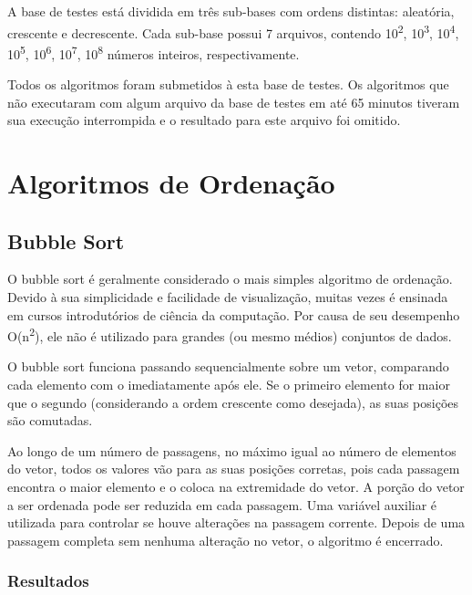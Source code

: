 \documentclass[fleqn,10pt]{SelfArx} %
\begin{document}
A base de testes está dividida em três sub-bases com ordens distintas: aleatória, crescente e decrescente. 
Cada sub-base possui 7 arquivos, contendo 10\textsuperscript{2}, 10\textsuperscript{3}, 10\textsuperscript{4}, 
10\textsuperscript{5}, 10\textsuperscript{6}, 10\textsuperscript{7}, 10\textsuperscript{8} números inteiros,
respectivamente.  

Todos os algoritmos foram submetidos à esta base de testes. Os algoritmos que não executaram com algum arquivo da base de 
testes em até 65 minutos tiveram sua execução interrompida e o resultado para este arquivo foi omitido.


\section{Algoritmos de Ordenação}

\subsection{Bubble Sort}

O bubble sort é geralmente considerado o mais simples algoritmo de ordenação. Devido à sua simplicidade e facilidade 
de visualização, muitas vezes é ensinada em cursos introdutórios de ciência da computação. Por causa de seu
desempenho O(n\textsuperscript{2}), ele não é utilizado para grandes (ou mesmo médios) conjuntos de dados.

O bubble sort funciona passando sequencialmente sobre um vetor, comparando cada elemento com o imediatamente após ele. Se 
o primeiro elemento for maior que o segundo (considerando a ordem crescente como desejada), as suas posições são comutadas. 

Ao longo de um número de passagens, no máximo igual ao número de elementos do vetor, todos os valores vão para as suas 
posições corretas, pois cada passagem encontra o maior elemento e o coloca na extremidade do vetor. A porção do vetor a ser 
ordenada pode ser reduzida em cada passagem. Uma variável auxiliar é utilizada para controlar se houve alterações 
na passagem corrente. Depois de uma passagem completa sem nenhuma alteração no vetor, o algoritmo é encerrado.

\subsubsection*{Resultados}
\end{document}

